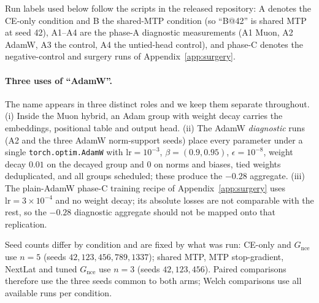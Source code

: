 Run labels used below follow the scripts in the released repository: A denotes the
CE-only condition and B the shared-MTP condition (so ``B@42'' is shared MTP at seed
42), A1--A4 are the phase-A diagnostic measurements (A1 Muon, A2 AdamW, A3 the
control, A4 the untied-head control), and phase-C denotes the negative-control and
surgery runs of Appendix~\ref{app:surgery}.

\paragraph{Three uses of ``AdamW''.} The name appears in three distinct roles and
we keep them separate throughout. (i) Inside the Muon hybrid, an Adam group with
weight decay carries the embeddings, positional table and output head. (ii) The
AdamW \emph{diagnostic} runs (A2 and the three AdamW norm-support seeds) place every
parameter under a single \texttt{torch.optim.AdamW} with $\mathrm{lr}{=}10^{-3}$,
$\beta{=}(0.9,0.95)$, $\epsilon{=}10^{-8}$, weight decay $0.01$ on the decayed group
and $0$ on norms and biases, tied weights deduplicated, and all groups scheduled;
these produce the ${-}0.28$ aggregate. (iii) The plain-AdamW phase-C training recipe
of Appendix~\ref{app:surgery} uses $\mathrm{lr}{=}3\times10^{-4}$ and no weight decay;
its absolute losses are not comparable with the rest, so the ${-}0.28$ diagnostic
aggregate should not be mapped onto that replication.

Seed counts differ by condition and are fixed by what was run: CE-only and
$G_{\text{nce}}$ use $n{=}5$ (seeds $42,123,456,789,1337$); shared MTP, MTP
stop-gradient, NextLat and tuned $G_{\text{nce}}$ use $n{=}3$ (seeds $42,123,456$).
Paired comparisons therefore use the three seeds common to both arms; Welch
comparisons use all available runs per condition.

